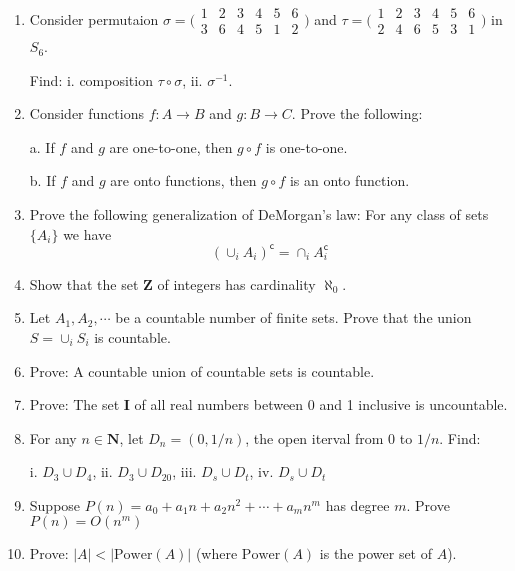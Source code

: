 \documentclass{article}
\begin{document}
\begin{enumerate}
  \item Consider permutaion
  $\sigma = \bigl(\begin{smallmatrix}
    1 & 2 & 3 & 4 & 5 & 6 \\ 3 & 6 & 4 & 5 & 1 & 2
    \end{smallmatrix} \bigr)$
  and $\tau = \bigl(\begin{smallmatrix}
    1 & 2 & 3 & 4 & 5 & 6 \\ 2 & 4 & 6 & 5 & 3 & 1
    \end{smallmatrix} \bigr)$ in $S_6$.

    Find: i. composition $\tau \circ \sigma$, ii. $\sigma^{-1}$.

    \item Consider functions $f: A\to B$ and $g: B\to C$. Prove the following:

    a. If $f$ and $g$ are one-to-one, then $g\circ f$ is one-to-one.

    b. If $f$ and $g$ are onto functions, then $g\circ f$ is an onto function.

    \item Prove the following generalization of DeMorgan's law: For any class of sets $\{A_i\}$ we have
    $$
    (\cup_i A_i)^\mathsf{c} = \cap_i A_i^\mathsf{c}
    $$

    \item Show that the set $\textbf{Z}$ of integers has cardinality $\aleph_0$.

    \item Let $A_1, A_2, \cdots$ be a countable number of finite sets.
    Prove that the union $S = \cup_i S_i$ is countable.

    \item Prove: A countable union of countable sets is countable.

    \item Prove: The set $\textbf{I}$ of all real numbers between 0 and 1 inclusive is uncountable.

    \item For any $n \in \textbf{N}$, let $D_n = (0, 1/n)$, the open iterval from $0$ to $1/n$. Find:

    i. $D_3 \cup D_4$, ii. $D_3 \cup D_20$, iii. $D_s \cup D_t$, iv. $D_s \cup D_t$

    \item Suppose $P(n) = a_0 + a_1 n + a_2 n^2 + \cdots + a_m n^m$ has degree $m$. Prove $P(n) = O(n^m)$

    \item Prove: $|A| < |\textrm{Power}(A)|$ (where $\textrm{Power}(A)$ is the power set of $A$).


\end{enumerate}
\end{document}
